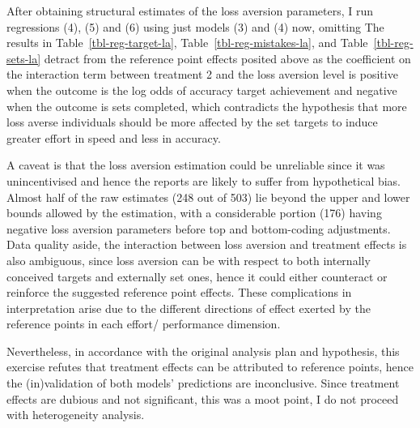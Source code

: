 \documentclass[
  12,
  letterpaper,
  DIV=11,
  numbers=noendperiod]{scrartcl}
\begin{document}
After obtaining structural estimates of the loss aversion parameters, I
run regressions (4), (5) and (6) using just models (3) and (4) now,
omitting The results in Table~\ref{tbl-reg-target-la},
Table~\ref{tbl-reg-mistakes-la}, and Table~\ref{tbl-reg-sets-la} detract
from the reference point effects posited above as the coefficient on the
interaction term between treatment 2 and the loss aversion level is
positive when the outcome is the log odds of accuracy target achievement
and negative when the outcome is sets completed, which contradicts the
hypothesis that more loss averse individuals should be more affected by
the set targets to induce greater effort in speed and less in accuracy.

A caveat is that the loss aversion estimation could be unreliable since
it was unincentivised and hence the reports are likely to suffer from
hypothetical bias. Almost half of the raw estimates (248 out of 503) lie
beyond the upper and lower bounds allowed by the estimation, with a
considerable portion (176) having negative loss aversion parameters
before top and bottom-coding adjustments. Data quality aside, the
interaction between loss aversion and treatment effects is also
ambiguous, since loss aversion can be with respect to both internally
conceived targets and externally set ones, hence it could either
counteract or reinforce the suggested reference point effects. These
complications in interpretation arise due to the different directions of
effect exerted by the reference points in each effort/ performance
dimension.

Nevertheless, in accordance with the original analysis plan and
hypothesis, this exercise refutes that treatment effects can be
attributed to reference points, hence the (in)validation of both models'
predictions are inconclusive. Since treatment effects are dubious and
not significant, this was a moot point, I do not proceed with
heterogeneity analysis.
\end{document}
